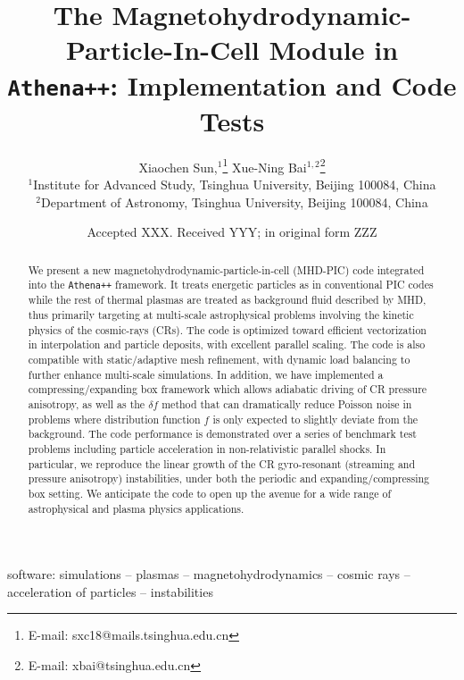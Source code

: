 \documentclass[fleqn,usenatbib]{mnras}
\title[The MHD-PIC Module in \texttt{Athena++}]{The Magnetohydrodynamic-Particle-In-Cell Module in \texttt{Athena++}: Implementation and Code Tests}
\author[X. Sun \& X.-N. Bai]{
Xiaochen Sun,$^{1}$\thanks{E-mail: sxc18@mails.tsinghua.edu.cn}
Xue-Ning Bai$^{1,2}$\thanks{E-mail: xbai@tsinghua.edu.cn}
\\
$^{1}$Institute for Advanced Study, Tsinghua University, Beijing 100084, China\\
$^{2}$Department of Astronomy, Tsinghua University, Beijing 100084, China
}
\date{Accepted XXX. Received YYY; in original form ZZZ}
\begin{document}
\label{firstpage}
\pagerange{\pageref{firstpage}--\pageref{lastpage}}
\maketitle

\begin{abstract}
We present a new magnetohydrodynamic-particle-in-cell (MHD-PIC) code integrated into the \texttt{Athena++} framework.
It treats energetic particles as in conventional PIC codes while the rest of thermal plasmas are treated as background fluid described by MHD, thus primarily targeting at multi-scale astrophysical problems involving the kinetic physics of the cosmic-rays (CRs).
The code is optimized toward efficient vectorization in interpolation and particle deposits, with excellent parallel scaling.
The code is also compatible with static/adaptive mesh refinement, with dynamic load balancing to further enhance multi-scale simulations. In addition, we have implemented a compressing/expanding box framework which allows adiabatic driving of CR pressure anisotropy, as well as the $\delta f$ method that can dramatically reduce Poisson noise in problems where distribution function $f$ is only expected to slightly deviate from the background. 
The code performance is demonstrated over a series of benchmark test problems including particle acceleration in non-relativistic parallel shocks. In particular, we reproduce the linear growth of the CR gyro-resonant (streaming and pressure anisotropy) instabilities, under both the periodic and expanding/compressing box setting. We anticipate the code to open up the avenue for a wide range of astrophysical and plasma physics applications.
\end{abstract}

\begin{keywords}
software: simulations -- plasmas -- magnetohydrodynamics -- cosmic rays -- acceleration of particles -- instabilities
\end{keywords}


\end{document}
